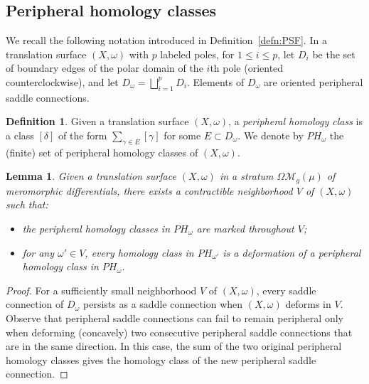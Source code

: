 \documentclass[11]{amsart}
\theoremstyle{plain}
\newtheorem{lemma}[theorem]{Lemma}
\theoremstyle{definition}
\newtheorem{definition}[theorem]{Definition}
\begin{document}
\subsection{Peripheral homology classes}

We recall the following notation introduced in Definition~\ref{defn:PSF}. In a translation surface $(X,\omega)$ with $p$ labeled poles, for $1 \leq i \leq p$, let $D_{i}$ be the set of boundary edges of the polar domain of the $i$th pole (oriented counterclockwise), and let $D_{\omega} = \bigsqcup\limits_{i=1}^{p} D_{i}$. Elements of $D_{\omega}$ are oriented peripheral saddle connections.

\begin{definition}
Given a translation surface $(X,\omega)$, a \textit{peripheral homology class} is a class $[\delta]$ of the form $\sum\limits_{\gamma \in E} [\gamma]$ for some $E \subset D_\omega$. We denote by $PH_{\omega}$ the (finite) set of peripheral homology classes of $(X,\omega)$. 
\end{definition}

\begin{lemma}\label{lem:PeripheralDeform}
Given a translation surface $(X,\omega)$ in a stratum $\Omega\mathcal{M}_{g}(\mu)$ of meromorphic differentials, there exists a contractible neighborhood $V$ of $(X,\omega)$ 
such that:
\begin{itemize}
\item the peripheral homology classes in $PH_{\omega}$ are marked throughout $V$;
\item for any $\omega' \in V$, every homology class in $PH_{\omega'}$ is a deformation of a peripheral homology class in $PH_{\omega}$.
\end{itemize} 
\end{lemma}

\begin{proof}
For a sufficiently small neighborhood $V$ of $(X,\omega)$, 
every saddle connection of $D_{\omega}$ persists as a saddle connection when $(X,\omega)$ deforms in $V$. Observe that peripheral saddle connections can fail to remain peripheral only when deforming (concavely) two consecutive peripheral saddle connections that are in the same direction. In this case, the sum of the two original peripheral homology classes gives the homology class of the new peripheral saddle connection. 
\end{proof}
\end{document}
